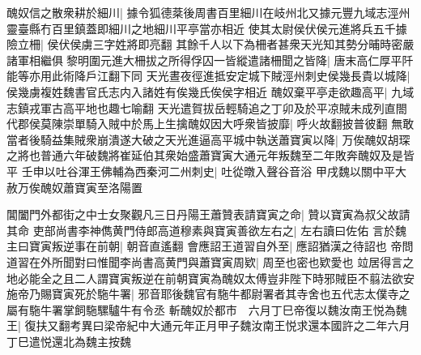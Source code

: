 醜奴信之散衆耕於細川|{
	據令狐德棻後周書百里細川在岐州北又據元豐九域志涇州靈臺縣冇百里鎮蓋即細川之地細川平亭當亦相近}
使其太尉侯伏侯元進將兵五千據險立柵|{
	侯伏侯虜三字姓將即亮翻}
其餘千人以下為柵者甚衆天光知其勢分晡時密嚴諸軍相繼俱黎明圍元進大柵拔之所得俘囚一皆縱遣諸柵聞之皆降|{
	唐末高仁厚平阡能等亦用此術降戶江翻下同}
天光晝夜徑進抵安定城下賊涇州刺史侯幾長貴以城降|{
	侯幾虜複姓魏書官氏志内入諸姓有俟幾氏俟侯字相近}
醜奴棄平亭走欲趣高平|{
	九域志鎮戎軍古高平地也趣七喻翻}
天光遣賀拔岳輕騎追之丁卯及於平凉賊未成列直閤代郡侯莫陳崇單騎入賊中於馬上生擒醜奴因大呼衆皆披靡|{
	呼火故翻披普彼翻}
無敢當者後騎益集賊衆崩潰遂大破之天光進逼高平城中執送蕭寶寅以降|{
	万俟醜奴胡琛之將也普通六年破魏將崔延伯其衆始盛蕭寶寅大通元年叛魏至二年敗奔醜奴及是皆平}
壬申以吐谷渾王佛輔為西秦河二州刺史|{
	吐從暾入聲谷音浴}
甲戌魏以關中平大赦万俟醜奴蕭寶寅至洛陽置

閶闔門外都街之中士女聚觀凡三日丹陽王蕭贊表請寶寅之命|{
	贊以寶寅為叔父故請其命}
吏部尚書李神儁黄門侍郎高道穆素與寶寅善欲左右之|{
	左右讀曰佐佑}
言於魏主曰寶寅叛逆事在前朝|{
	朝音直遙翻}
會應詔王道習自外至|{
	應詔猶漢之待詔也}
帝問道習在外所聞對曰惟聞李尚書高黄門與蕭寶寅周欵|{
	周至也密也欵愛也}
竝居得言之地必能全之且二人謂寶寅叛逆在前朝寶寅為醜奴太傅豈非陛下時邪賊臣不翦法欲安施帝乃賜寶寅死於駞牛署|{
	邪音耶後魏官有駞牛都尉署者其寺舍也五代志太僕寺之屬有駞牛署掌飼駞騾驢牛有令丞}
斬醜奴於都市　六月丁巳帝復以魏汝南王悦為魏王|{
	復扶又翻考異曰梁帝紀中大通元年正月甲子魏汝南王悦求還本國許之二年六月丁巳遣悦還北為魏主按魏}


